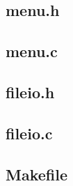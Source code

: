 \documentclass{article}
\begin{document}
\subsection{menu.h}


\subsection{menu.c}


\subsection{fileio.h}


\subsection{fileio.c}


\subsection{Makefile}

\end{document}
